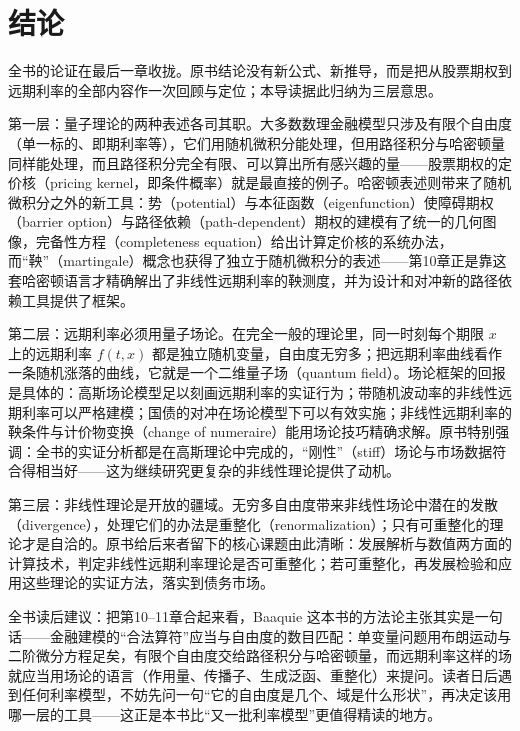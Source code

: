 \chapter{结论}

全书的论证在最后一章收拢。原书结论没有新公式、新推导，而是把从股票期权到远期利率的全部内容作一次回顾与定位；本导读据此归纳为三层意思。

第一层：量子理论的两种表述各司其职。大多数数理金融模型只涉及有限个自由度（单一标的、即期利率等），它们用随机微积分能处理，但用路径积分与哈密顿量同样能处理，而且路径积分完全有限、可以算出所有感兴趣的量——股票期权的定价核（pricing kernel，即条件概率）就是最直接的例子。哈密顿表述则带来了随机微积分之外的新工具：势（potential）与本征函数（eigenfunction）使障碍期权（barrier option）与路径依赖（path-dependent）期权的建模有了统一的几何图像，完备性方程（completeness equation）给出计算定价核的系统办法，而“鞅”（martingale）概念也获得了独立于随机微积分的表述——第10章正是靠这套哈密顿语言才精确解出了非线性远期利率的鞅测度，并为设计和对冲新的路径依赖工具提供了框架。

第二层：远期利率必须用量子场论。在完全一般的理论里，同一时刻每个期限 $x$ 上的远期利率 $f(t,x)$ 都是独立随机变量，自由度无穷多；把远期利率曲线看作一条随机涨落的曲线，它就是一个二维量子场（quantum field）。场论框架的回报是具体的：高斯场论模型足以刻画远期利率的实证行为；带随机波动率的非线性远期利率可以严格建模；国债的对冲在场论模型下可以有效实施；非线性远期利率的鞅条件与计价物变换（change of numeraire）能用场论技巧精确求解。原书特别强调：全书的实证分析都是在高斯理论中完成的，“刚性”（stiff）场论与市场数据符合得相当好——这为继续研究更复杂的非线性理论提供了动机。

第三层：非线性理论是开放的疆域。无穷多自由度带来非线性场论中潜在的发散（divergence），处理它们的办法是重整化（renormalization）；只有可重整化的理论才是自洽的。原书给后来者留下的核心课题由此清晰：发展解析与数值两方面的计算技术，判定非线性远期利率理论是否可重整化；若可重整化，再发展检验和应用这些理论的实证方法，落实到债务市场。

全书读后建议：把第10--11章合起来看，Baaquie 这本书的方法论主张其实是一句话——金融建模的“合法算符”应当与自由度的数目匹配：单变量问题用布朗运动与二阶微分方程足矣，有限个自由度交给路径积分与哈密顿量，而远期利率这样的场就应当用场论的语言（作用量、传播子、生成泛函、重整化）来提问。读者日后遇到任何利率模型，不妨先问一句“它的自由度是几个、域是什么形状”，再决定该用哪一层的工具——这正是本书比“又一批利率模型”更值得精读的地方。

